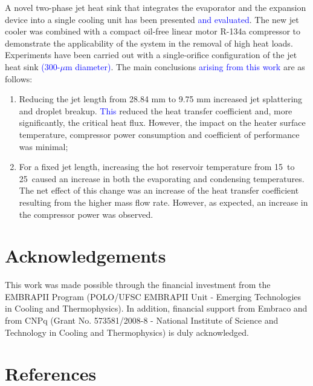 \documentclass[review,preprint,12pt]{elsarticle}
\begin{document}
A novel two-phase jet heat sink that integrates the evaporator and the expansion device into a single cooling unit has been presented \textcolor{blue}{and evaluated}. The new jet cooler was combined with a compact oil-free linear motor R-134a compressor to demonstrate the applicability of the system in the removal of high heat loads. Experiments have been carried out with a single-orifice configuration of the jet heat sink \textcolor{blue}{(300-$\mu$m diameter)}. %
 The main conclusions \textcolor{blue}{arising from this work} are as follows:

\begin{enumerate}
\item Reducing the jet length from 28.84 mm to 9.75 mm increased jet splattering and droplet breakup. \textcolor{blue}{This} reduced the heat transfer coefficient and, more significantly, the critical heat flux. However, the impact on the heater surface temperature, compressor power consumption and coefficient of performance was minimal;
\item For a fixed jet length, increasing the hot reservoir temperature from 15\textcelsius\ to 25\textcelsius\ caused an increase in both the evaporating and condensing temperatures. The net effect of this change was an increase of the heat transfer coefficient resulting from the higher mass flow rate. However, as expected, an increase in the compressor power was observed.
\end{enumerate}

\section*{Acknowledgements}

This work was made possible through the financial investment from the EMBRAPII Program (POLO/UFSC EMBRAPII Unit - Emerging Technologies in Cooling and Thermophysics). In addition, financial support from Embraco and from CNPq (Grant No. 573581/2008-8 - National Institute of Science and Technology in Cooling and Thermophysics) is duly acknowledged.

\section*{References}





\end{document}
